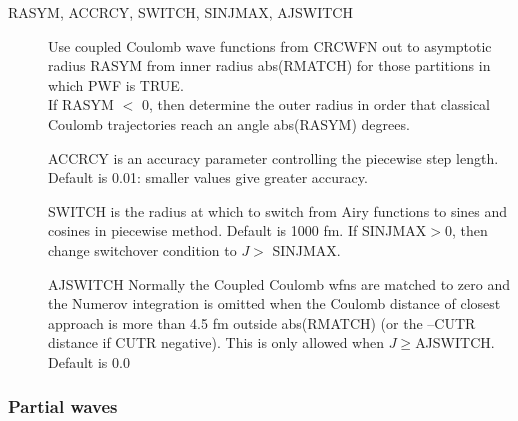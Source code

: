 \documentclass[11pt]{article}
\begin{document}
%
\begin{description}
\item[RASYM, ACCRCY, SWITCH, SINJMAX, AJSWITCH] \hfill


Use coupled Coulomb wave functions from CRCWFN out to asymptotic radius RASYM from
inner radius abs(RMATCH) for those partitions in which PWF is TRUE.
\\
If RASYM $<$ 0, then determine the outer radius in order that classical
Coulomb trajectories reach an angle abs(RASYM) degrees.


ACCRCY is an accuracy parameter controlling the piecewise step length.
Default is 0.01: smaller values give greater accuracy.


SWITCH is the radius at which to switch from Airy functions
to sines and cosines in piecewise method.  Default is 1000 fm.
If SINJMAX$>0$, then change switchover condition to $J>$ SINJMAX.


AJSWITCH
Normally the Coupled Coulomb wfns are matched to zero
and the Numerov integration is omitted
when the Coulomb distance of closest approach is more than 4.5 fm outside
abs(RMATCH) (or  the  --CUTR distance if   CUTR negative).
This is only allowed when $J \geq $AJSWITCH.  Default is 0.0
\end{description}

\subsubsection{Partial waves}
\end{document}
